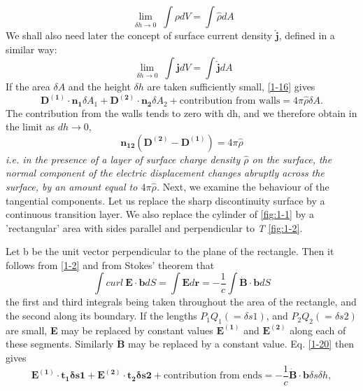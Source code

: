 \documentclass[lang=en,11pt]{elegantbook}
\begin{document}
	\begin{equation}
	\lim_{\substack{\delta h\rightarrow 0}}\int\rho dV=\int\hat{\rho}dA
	\label{1-17}
	\end{equation}
	We shall also need later the concept of surface current density $\mathbf{\hat{j}}$, defined in a similar way:
	\begin{equation}
	\lim_{\substack{\delta h\rightarrow 0}}\int\mathbf{j}dV=\int\mathbf{\hat{j}}dA
	\label{1-18}
	\end{equation}
	If the area $\delta A$ and the height $\delta h$ are taken sufficiently small, \eqref{1-16} gives
	\begin{equation*}
	\mathbf{D^{(1)}\cdot n_{1}}\delta A_{1}+\mathbf{D^{(2)}\cdot n_{2}}\delta A_{2}+\text{contribution from walls}=4\pi\hat{\rho}\delta A.
	\end{equation*}
	The contribution from the walls tends to zero with dh, and we therefore obtain in the
	limit as $dh\rightarrow0$,
	\begin{equation}
	\mathbf{n_{12}}(\mathbf{D^{(2)}}-\mathbf{D^{(1)}})=4\pi\hat{\rho}
	\label{1-19}
	\end{equation}
	\textit{i.e. in the presence of a layer of surface charge density $\hat{\rho}$ on the surface, the normal component of the electric displacement changes abruptly across the surface, by an amount equal to $4\pi\hat{\rho}$.}
	Next, we examine the behaviour of the tangential components. Let us replace the sharp discontinuity surface by a continuous transition layer. We also replace the cylinder of \eqref{fig:1-1} by a 'rectangular' area with sides parallel and perpendicular to \textit{T} \eqref{fig:1-2}.\par
	Let b be the unit vector perpendicular to the plane of the rectangle. Then it follows from \eqref{1-2} and from Stokes' theorem that
	\begin{equation}
	\int curl\ \mathbf{E\cdot b}dS=\int\mathbf{E}d\mathbf{r}=-\frac{1}{c}\int\mathbf{\dot{B}\cdot b}dS
	\label{1-20}
	\end{equation}
	the first and third integrals being taken throughout the area of the rectangle, and the	second along its boundary. If the lengths $P_1Q_1(=\delta{s1})$, and $P_2Q_2(=\delta{s2})$ are small, \textbf{E} may be replaced by constant values $\mathbf{E^{(1)}}$ and $\mathbf{E^{(2)}}$ along each of these segments. Similarly $\mathbf{\dot{B}}$ may be replaced by a constant value. Eq. \eqref{1-20} then gives
	\begin{equation}
	\mathbf{E^{(1)}\cdot t_1\delta{s1}}+\mathbf{E^{(2)}\cdot t_2\delta{s2}}+\text{contribution from ends}=-\frac{1}{c}\mathbf{\dot{B}\cdot b}\delta s\delta h,
	\label{1-21}
	\end{equation}
\end{document}
